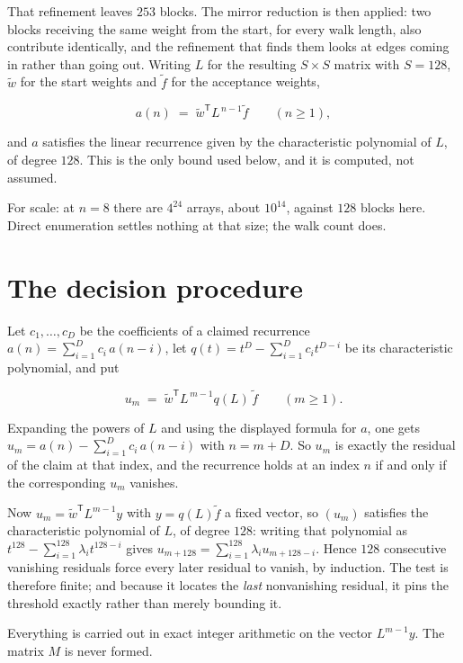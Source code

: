 \documentclass[11pt]{article}
\theoremstyle{definition}
\begin{document}
That refinement leaves $253$ blocks. The mirror reduction is then applied: two blocks receiving the same weight from the start, for every walk length, also contribute identically, and the refinement that finds them looks at edges coming in rather than going out. Writing $L$ for the resulting $S \times S$ matrix with $S = 128$, $\tilde w$ for the start weights and $\tilde f$ for the acceptance weights,

\[a(n) \;=\; \tilde w^{\mathsf T} L^{\,n-1} \tilde f \qquad (n \ge 1),\]

and $a$ satisfies the linear recurrence given by the characteristic polynomial of $L$, of degree $128$. This is the only bound used below, and it is computed, not assumed.

For scale: at $n = 8$ there are $4^{24}$ arrays, about $10^{14}$, against $128$ blocks here. Direct enumeration settles nothing at that size; the walk count does.

\section{The decision procedure}

Let $c_1,\dots,c_D$ be the coefficients of a claimed recurrence $a(n) = \sum_{i=1}^{D} c_i\,a(n-i)$, let $q(t) = t^{D} - \sum_{i=1}^{D} c_i t^{D-i}$ be its characteristic polynomial, and put

\[u_m \;=\; \tilde w^{\mathsf T} L^{\,m-1} q(L)\,\tilde f \qquad (m \ge 1).\]

Expanding the powers of $L$ and using the displayed formula for $a$, one gets $u_m = a(n) - \sum_{i=1}^{D} c_i\,a(n-i)$ with $n = m + D$. So $u_m$ is exactly the residual of the claim at that index, and the recurrence holds at an index $n$ if and only if the corresponding $u_m$ vanishes.

Now $u_m = \tilde w^{\mathsf T} L^{m-1} y$ with $y = q(L)\tilde f$ a fixed vector, so $(u_m)$ satisfies the characteristic polynomial of $L$, of degree $128$: writing that polynomial as $t^{128} - \sum_{i=1}^{128} \lambda_i t^{128-i}$ gives $u_{m+128} = \sum_{i=1}^{128} \lambda_i u_{m+128-i}$. Hence $128$ consecutive vanishing residuals force every later residual to vanish, by induction. The test is therefore finite; and because it locates the {\itshape last} nonvanishing residual, it pins the threshold exactly rather than merely bounding it.

Everything is carried out in exact integer arithmetic on the vector $L^{m-1}y$. The matrix $M$ is never formed.
\end{document}
